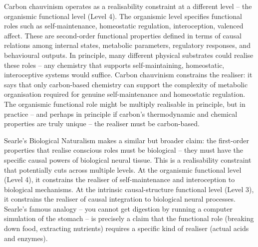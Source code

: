 \documentclass[11pt, a4paper, onecolumn, gdm]{google}
\begin{document}
Carbon chauvinism operates as a realisability constraint at a different level -- the organismic functional level (Level 4).
The organismic level specifies functional roles such as self-maintenance, homeostatic regulation, interoception, valenced affect.
These are second-order functional properties defined in terms of causal relations among internal states, metabolic parameters, regulatory responses, and behavioural outputs.
In principle, many different physical substrates could realise these roles -- any chemistry that supports self-maintaining, homeostatic, interoceptive systems would suffice.
Carbon chauvinism constrains the realiser: it says that only carbon-based chemistry can support the complexity of metabolic organisation required for genuine self-maintenance and homeostatic regulation.
The organismic functional role might be multiply realisable in principle, but in practice -- and perhaps in principle if carbon's thermodynamic and chemical properties are truly unique -- the realiser must be carbon-based.

Searle's Biological Naturalism \citep{searle1992,searle2017} makes a similar but broader claim: the first-order properties that realise conscious roles must be biological -- they must have the specific causal powers of biological neural tissue.
This is a realisability constraint that potentially cuts across multiple levels.
At the organismic functional level (Level 4), it constrains the realiser of self-maintenance and interoception to biological mechanisms.
At the intrinsic causal-structure functional level (Level 3), it constrains the realiser of causal integration to biological neural processes.
Searle's famous analogy \citep{searle1980} -- you cannot get digestion by running a computer simulation of the stomach -- is precisely a claim that the functional role (breaking down food, extracting nutrients) requires a specific kind of realiser (actual acids and enzymes).
\end{document}
